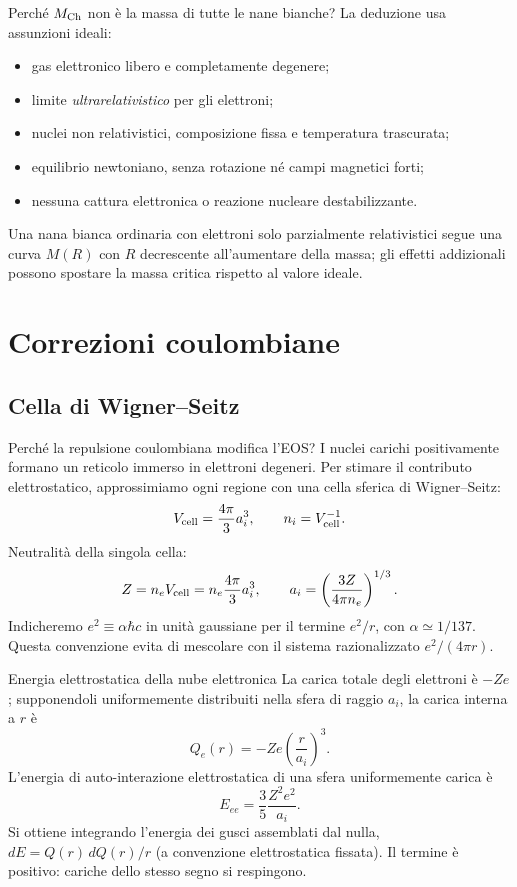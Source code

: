 \begin{frame}[t]{Perché $M_{\rm Ch}$ non è la massa di tutte le nane bianche?}
\small
La deduzione usa assunzioni ideali:
\begin{itemize}
\item gas elettronico libero e completamente degenere;
\item limite \emph{ultrarelativistico} per gli elettroni;
\item nuclei non relativistici, composizione fissa e temperatura trascurata;
\item equilibrio newtoniano, senza rotazione né campi magnetici forti;
\item nessuna cattura elettronica o reazione nucleare destabilizzante.
\end{itemize}
Una nana bianca ordinaria con elettroni solo parzialmente relativistici segue una curva $M(R)$ con $R$ decrescente all'aumentare della massa; gli effetti addizionali possono spostare la massa critica rispetto al valore ideale.
\end{frame}

\section{Correzioni coulombiane}

\subsection{Cella di Wigner--Seitz}\label{ssec:wignerseitz}

\begin{frame}[t]{Perché la repulsione coulombiana modifica l'EOS?}
\small
I nuclei carichi positivamente formano un reticolo immerso in elettroni degeneri. Per stimare il contributo elettrostatico, approssimiamo ogni regione con una cella sferica di Wigner--Seitz:
\[
V_{\rm cell}=\frac{4\pi}3a_i^3,\qquad n_i=V_{\rm cell}^{-1}.
\]
Neutralità della singola cella:
\[
Z=n_eV_{\rm cell}=n_e\frac{4\pi}3a_i^3,
\qquad a_i=\left(\frac{3Z}{4\pi n_e}\right)^{1/3}.
\]
Indicheremo $e^2\equiv\alpha\hbar c$ in unità gaussiane per il termine $e^2/r$, con $\alpha\simeq1/137$. Questa convenzione evita di mescolare con il sistema razionalizzato $e^2/(4\pi r)$.
\end{frame}

\begin{frame}[t]{Energia elettrostatica della nube elettronica}
\small
La carica totale degli elettroni è $-Ze$; supponendoli uniformemente distribuiti nella sfera di raggio $a_i$, la carica interna a $r$ è
\[
Q_e(r)=-Ze\left(\frac r{a_i}\right)^3.
\]
L'energia di auto-interazione elettrostatica di una sfera uniformemente carica è
\[
E_{ee}=\frac35\frac{Z^2e^2}{a_i}.
\]
Si ottiene integrando l'energia dei gusci assemblati dal nulla, $dE=Q(r)\,dQ(r)/r$ (a convenzione elettrostatica fissata).
\medskip
Il termine è positivo: cariche dello stesso segno si respingono.
\end{frame}

